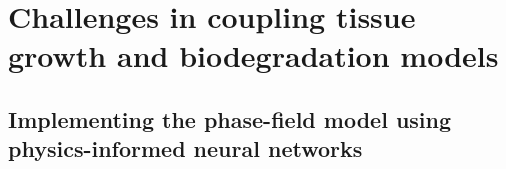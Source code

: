 \section{Challenges in coupling tissue growth and biodegradation models}

\begin{subappendices}

\section{Implementing the phase-field model using physics-informed neural networks}



\end{subappendices}

\cleardoublepage

